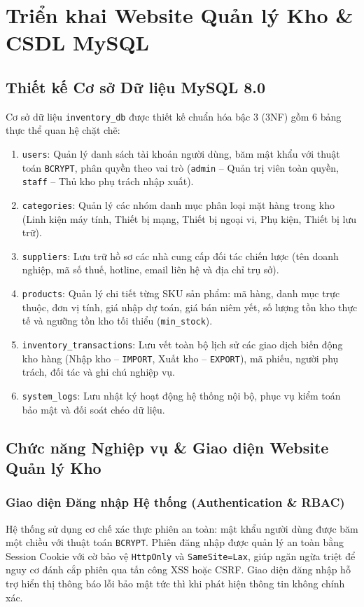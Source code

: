 \documentclass[12pt,a4paper,oneside]{report}
\begin{document}
\chapter{Triển khai Website Quản lý Kho \& CSDL MySQL}

\section{Thiết kế Cơ sở Dữ liệu MySQL 8.0}
Cơ sở dữ liệu \texttt{inventory\_db} được thiết kế chuẩn hóa bậc 3 (3NF) gồm 6 bảng thực thể quan hệ chặt chẽ:
\begin{enumerate}
    \item \texttt{users}: Quản lý danh sách tài khoản người dùng, băm mật khẩu với thuật toán \texttt{BCRYPT}, phân quyền theo vai trò (\texttt{admin} -- Quản trị viên toàn quyền, \texttt{staff} -- Thủ kho phụ trách nhập xuất).
    \item \texttt{categories}: Quản lý các nhóm danh mục phân loại mặt hàng trong kho (Linh kiện máy tính, Thiết bị mạng, Thiết bị ngoại vi, Phụ kiện, Thiết bị lưu trữ).
    \item \texttt{suppliers}: Lưu trữ hồ sơ các nhà cung cấp đối tác chiến lược (tên doanh nghiệp, mã số thuế, hotline, email liên hệ và địa chỉ trụ sở).
    \item \texttt{products}: Quản lý chi tiết từng SKU sản phẩm: mã hàng, danh mục trực thuộc, đơn vị tính, giá nhập dự toán, giá bán niêm yết, số lượng tồn kho thực tế và ngưỡng tồn kho tối thiểu (\texttt{min\_stock}).
    \item \texttt{inventory\_transactions}: Lưu vết toàn bộ lịch sử các giao dịch biến động kho hàng (Nhập kho -- \texttt{IMPORT}, Xuất kho -- \texttt{EXPORT}), mã phiếu, người phụ trách, đối tác và ghi chú nghiệp vụ.
    \item \texttt{system\_logs}: Lưu nhật ký hoạt động hệ thống nội bộ, phục vụ kiểm toán bảo mật và đối soát chéo dữ liệu.
\end{enumerate}

\section{Chức năng Nghiệp vụ \& Giao diện Website Quản lý Kho}

\subsection{Giao diện Đăng nhập Hệ thống (Authentication \& RBAC)}
Hệ thống sử dụng cơ chế xác thực phiên an toàn: mật khẩu người dùng được băm một chiều với thuật toán \texttt{BCRYPT}. Phiên đăng nhập được quản lý an toàn bằng Session Cookie với cờ bảo vệ \texttt{HttpOnly} và \texttt{SameSite=Lax}, giúp ngăn ngừa triệt để nguy cơ đánh cắp phiên qua tấn công XSS hoặc CSRF. Giao diện đăng nhập hỗ trợ hiển thị thông báo lỗi bảo mật tức thì khi phát hiện thông tin không chính xác.
\end{document}
